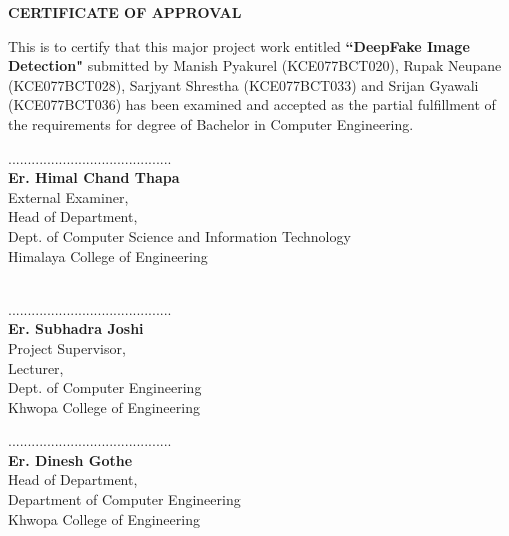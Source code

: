 
\vspace*{1in}

\begin{center}
	\large{\textbf{CERTIFICATE OF APPROVAL}}
\end{center}
\vspace{1cm}
This is to certify that this major project work entitled \textbf{``DeepFake Image Detection"} submitted by Manish Pyakurel (KCE077BCT020), Rupak Neupane (KCE077BCT028), Sarjyant Shrestha (KCE077BCT033) and Srijan Gyawali\\(KCE077BCT036) has been examined and accepted as the partial fulfillment of the requirements for degree of Bachelor in Computer Engineering.\\
\vspace{1in}
\begin{multicols}{2}
	\begin{center}
		..........................................\\
		\textbf{Er. Himal Chand Thapa}\\
		External Examiner,\\
    Head of Department,\\
		Dept. of Computer Science and Information Technology\\
		Himalaya College of Engineering\\
		\textbf{}\\
		
	\end{center}

\columnbreak
	\begin{center}
		..........................................\\
		\textbf{Er. Subhadra Joshi}\\
		Project Supervisor,\\
    Lecturer,\\
    Dept. of Computer Engineering\\
    Khwopa College of Engineering
	\end{center}
\end{multicols}
\vspace{1in}
\begin{center}
	..........................................\\
	\textbf{Er. Dinesh Gothe}\\
	Head of Department,\\
	Department of Computer Engineering\\
	Khwopa College of Engineering
\end{center}
\pagebreak



